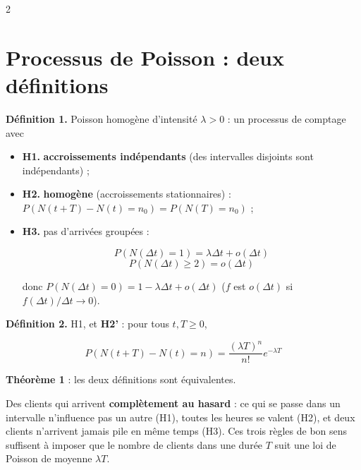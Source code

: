 \documentclass[a4paper,9pt]{extarticle}
\begin{document}
\begin{multicols}{2}
\begin{simple}
\end{simple}


\section{Processus de Poisson : deux définitions}


\begin{definition}

\textbf{Définition 1.} Poisson homogène d'intensité $\lambda > 0$ : un processus de comptage
avec

\begin{itemize}

\item \textbf{H1.} \textbf{accroissements indépendants} (des intervalles disjoints sont
indépendants) ;

\item \textbf{H2.} \textbf{homogène} (accroissements stationnaires) : $P(N(t+T) - N(t) = n_0) =
P(N(T) = n_0)$ ;

\item \textbf{H3.} pas d'arrivées groupées :

\[
P(N(\Delta t) = 1) = \lambda\Delta t + o(\Delta t)
\]
\[
P(N(\Delta t)\ge2) = o(\Delta t)
\]

donc $P(N(\Delta t) = 0) = 1 - \lambda\Delta t + o(\Delta t)$ ($f$ est $o(\Delta t)$ si
$f(\Delta t)/\Delta t\to0$).

\end{itemize}

\end{definition}


\begin{definition}

\textbf{Définition 2.} H1, et \textbf{H2'} : pour tous $t, T\ge0$,

\[
P(N(t+T) - N(t) = n) = \frac{(\lambda T)^n}{n!}e^{-\lambda T}
\]

\textbf{Théorème 1} : les deux définitions sont équivalentes.

\end{definition}


\begin{simple}

Des clients qui arrivent \textbf{complètement au hasard} : ce qui se passe dans un intervalle
n'influence pas un autre (H1), toutes les heures se valent (H2), et deux clients n'arrivent
jamais pile en même temps (H3). Ces trois règles de bon sens suffisent à imposer que le nombre
de clients dans une durée $T$ suit une loi de Poisson de moyenne $\lambda T$.


\end{simple}
\end{multicols}
\end{document}

